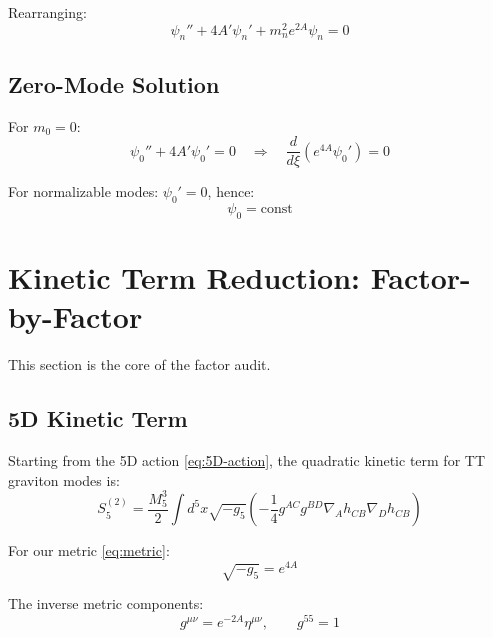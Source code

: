 \documentclass[11pt,a4paper]{article}
\newcommand{\Mfive}{M_5}
\begin{document}
Rearranging:
\begin{equation}
\boxed{\psi_n'' + 4A' \psi_n' + m_n^2 e^{2A} \psi_n = 0}
\label{eq:mode-eq}
\end{equation}

\subsection{Zero-Mode Solution}

For $m_0 = 0$:
\begin{equation}
\psi_0'' + 4A' \psi_0' = 0 \quad \Rightarrow \quad
\frac{d}{d\xi}(e^{4A}\psi_0') = 0
\label{eq:zero-mode-eq}
\end{equation}

For normalizable modes: $\psi_0' = 0$, hence:
\begin{equation}
\psi_0 = \text{const}
\label{eq:psi0-const}
\end{equation}

\section{Kinetic Term Reduction: Factor-by-Factor}

This section is the core of the factor audit.

\subsection{5D Kinetic Term}

Starting from the 5D action \eqref{eq:5D-action}, the quadratic kinetic term
for TT graviton modes is:
\begin{equation}
S_5^{(2)} = \frac{\Mfive^3}{2} \int d^5x \sqrt{-g_5}
\left( -\frac{1}{4} g^{AC} g^{BD} \nabla_A h_{CB} \nabla_D h_{CB} \right)
\label{eq:5D-kin-full}
\end{equation}

For our metric \eqref{eq:metric}:
\begin{equation}
\sqrt{-g_5} = e^{4A}
\label{eq:sqrt-g5}
\end{equation}

The inverse metric components:
\begin{equation}
g^{\mu\nu} = e^{-2A} \eta^{\mu\nu}, \qquad g^{55} = 1
\label{eq:inverse-metric}
\end{equation}
\end{document}
